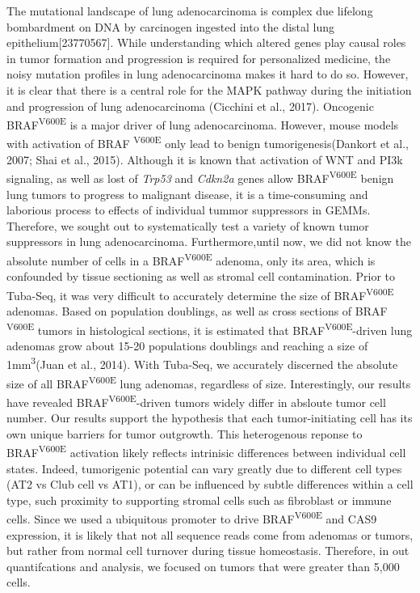 The mutational landscape of lung adenocarcinoma is complex due lifelong bombardment on DNA by carcinogen ingested into the distal lung epithelium{[}23770567{]}.
While understanding which altered genes play causal roles in tumor formation and progression is required for personalized medicine, the noisy mutation profiles in lung adenocarcinoma makes it hard to do so.
However, it is clear that there is a central role for the MAPK pathway during the initiation and progression of lung adenocarcinoma (Cicchini et al., 2017).
Oncogenic BRAF\textsuperscript{V600E} is a major driver of lung adenocarcinoma.
However, mouse models with activation of BRAF \textsuperscript{V600E} only lead to benign tumorigenesis(Dankort et al., 2007; Shai et al., 2015).
Although it is known that activation of WNT and PI3k signaling, as well as lost of \emph{Trp53} and \emph{Cdkn2a} genes allow BRAF\textsuperscript{V600E} benign lung tumors to progress to malignant disease, it is a time-consuming and laborious process to effects of individual tummor suppressors in GEMMs.
Therefore, we sought out to systematically test a variety of known tumor suppressors in lung adenocarcinoma.
Furthermore,until now, we did not know the absolute number of cells in a BRAF\textsuperscript{V600E} adenoma, only its area, which is confounded by tissue sectioning as well as stromal cell contamination.
Prior to Tuba-Seq, it was very difficult to accurately determine the size of BRAF\textsuperscript{V600E} adenomas.
Based on population doublings, as well as cross sections of BRAF \textsuperscript{V600E} tumors in histological sections, it is estimated that BRAF\textsuperscript{V600E}-driven lung adenomas grow about 15-20 populations doublings and reaching a size of 1mm\textsuperscript{3}(Juan et al., 2014).
With Tuba-Seq, we accurately discerned the absolute size of all BRAF\textsuperscript{V600E} lung adenomas, regardless of size.
Interestingly, our results have revealed BRAF\textsuperscript{V600E}-driven tumors widely differ in absloute tumor cell number. Our results support the hypothesis that each tumor-initiating cell has its own unique barriers for tumor outgrowth.
This heterogenous reponse to BRAF\textsuperscript{V600E} activation likely reflects intrinisic differences between individual cell states.
Indeed, tumorigenic potential can vary greatly due to different cell types (AT2 vs Club cell vs AT1), or can be influenced by subtle differences within a cell type, such proximity to supporting stromal cells such as fibroblast or immune cells.
Since we used a ubiquitous promoter to drive BRAF\textsuperscript{V600E} and CAS9 expression, it is likely that not all sequence reads come from adenomas or tumors, but rather from normal cell turnover during tissue homeostasis.
Therefore, in out quantifcations and analysis, we focused on tumors that were greater than 5,000 cells.

